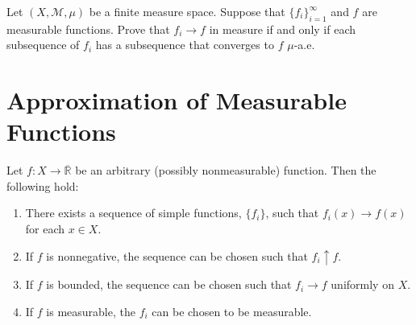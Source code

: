 \documentclass[../main.tex]{subfiles}
\begin{document}
\begin{theorem}{}{}
    Let $(X, \mathcal{M}, \mu)$ be a finite measure space. Suppose that $\{f_i\}_{i=1}^{\infty}$ and $f$ are measurable functions. Prove that $f_i \to f$ in measure if and only if each subsequence of $f_i$ has a subsequence that converges to $f$ $\mu$-a.e.
\end{theorem}
\section{Approximation of Measurable Functions}

\begin{theorem}{}{}
Let $f: X \to \overline{\mathbb{R}}$ be an arbitrary (possibly nonmeasurable) function. Then the following hold:
\begin{enumerate}
\item[(i)] There exists a sequence of simple functions, $\{f_i\}$, such that $f_i(x) \to f(x)$ for each $x \in X$.
\item[(ii)] If $f$ is nonnegative, the sequence can be chosen such that $f_i \uparrow f$.
\item[(iii)] If $f$ is bounded, the sequence can be chosen such that $f_i \to f$ uniformly on $X$.
\item[(iv)] If $f$ is measurable, the $f_i$ can be chosen to be measurable.
\end{enumerate}
\end{theorem}
\end{document}
